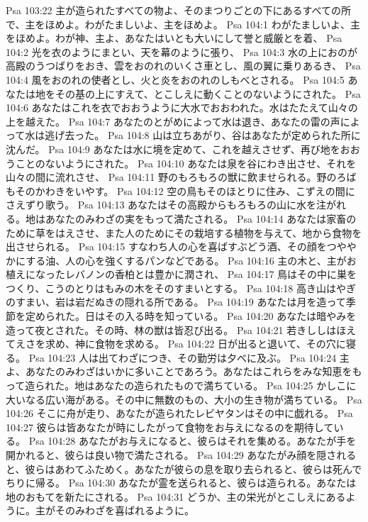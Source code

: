 Psa 103:22  主が造られたすべての物よ、そのまつりごとの下にあるすべての所で、主をほめよ。わがたましいよ、主をほめよ。
Psa 104:1  わがたましいよ、主をほめよ。わが神、主よ、あなたはいとも大いにして誉と威厳とを着、
Psa 104:2  光を衣のようにまとい、天を幕のように張り、
Psa 104:3  水の上におのが高殿のうつばりをおき、雲をおのれのいくさ車とし、風の翼に乗りあるき、
Psa 104:4  風をおのれの使者とし、火と炎をおのれのしもべとされる。
Psa 104:5  あなたは地をその基の上にすえて、とこしえに動くことのないようにされた。
Psa 104:6  あなたはこれを衣でおおうように大水でおおわれた。水はたたえて山々の上を越えた。
Psa 104:7  あなたのとがめによって水は退き、あなたの雷の声によって水は逃げ去った。
Psa 104:8  山は立ちあがり、谷はあなたが定められた所に沈んだ。
Psa 104:9  あなたは水に境を定めて、これを越えさせず、再び地をおおうことのないようにされた。
Psa 104:10  あなたは泉を谷にわき出させ、それを山々の間に流れさせ、
Psa 104:11  野のもろもろの獣に飲ませられる。野のろばもそのかわきをいやす。
Psa 104:12  空の鳥もそのほとりに住み、こずえの間にさえずり歌う。
Psa 104:13  あなたはその高殿からもろもろの山に水を注がれる。地はあなたのみわざの実をもって満たされる。
Psa 104:14  あなたは家畜のために草をはえさせ、また人のためにその栽培する植物を与えて、地から食物を出させられる。
Psa 104:15  すなわち人の心を喜ばすぶどう酒、その顔をつややかにする油、人の心を強くするパンなどである。
Psa 104:16  主の木と、主がお植えになったレバノンの香柏とは豊かに潤され、
Psa 104:17  鳥はその中に巣をつくり、こうのとりはもみの木をそのすまいとする。
Psa 104:18  高き山はやぎのすまい、岩は岩だぬきの隠れる所である。
Psa 104:19  あなたは月を造って季節を定められた。日はその入る時を知っている。
Psa 104:20  あなたは暗やみを造って夜とされた。その時、林の獣は皆忍び出る。
Psa 104:21  若きししはほえてえさを求め、神に食物を求める。
Psa 104:22  日が出ると退いて、その穴に寝る。
Psa 104:23  人は出てわざにつき、その勤労は夕べに及ぶ。
Psa 104:24  主よ、あなたのみわざはいかに多いことであろう。あなたはこれらをみな知恵をもって造られた。地はあなたの造られたもので満ちている。
Psa 104:25  かしこに大いなる広い海がある。その中に無数のもの、大小の生き物が満ちている。
Psa 104:26  そこに舟が走り、あなたが造られたレビヤタンはその中に戯れる。
Psa 104:27  彼らは皆あなたが時にしたがって食物をお与えになるのを期待している。
Psa 104:28  あなたがお与えになると、彼らはそれを集める。あなたが手を開かれると、彼らは良い物で満たされる。
Psa 104:29  あなたがみ顔を隠されると、彼らはあわてふためく。あなたが彼らの息を取り去られると、彼らは死んでちりに帰る。
Psa 104:30  あなたが霊を送られると、彼らは造られる。あなたは地のおもてを新たにされる。
Psa 104:31  どうか、主の栄光がとこしえにあるように。主がそのみわざを喜ばれるように。
